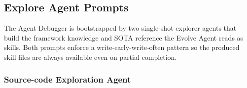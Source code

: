 \subsection{Explore Agent Prompts}
\label{app:prompts:explore}

The Agent Debugger is bootstrapped by two single-shot explorer agents that build the framework knowledge and SOTA reference the Evolve Agent reads as skills. Both prompts enforce a write-early-write-often pattern so the produced skill files are always available even on partial completion.

\subsubsection{Source-code Exploration Agent}
\label{app:prompts:explore-source}

